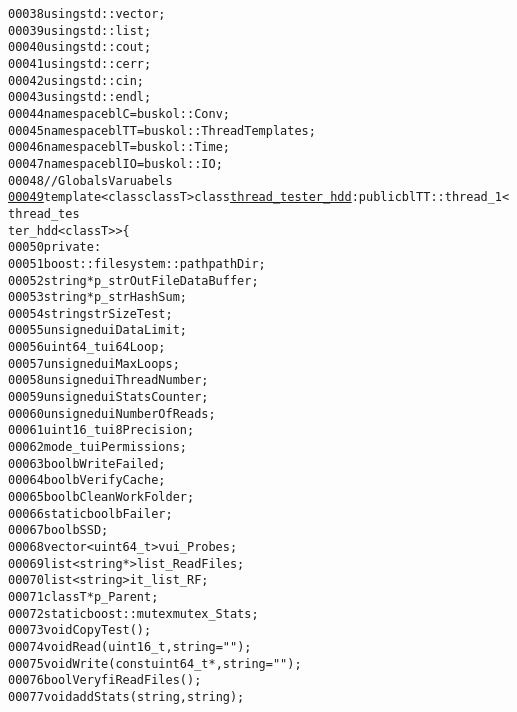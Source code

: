 \begin{footnotesize}
\begin{alltt}
00038 \textcolor{keyword}{using} std::vector;
00039 \textcolor{keyword}{using} std::list;
00040 \textcolor{keyword}{using} std::cout;
00041 \textcolor{keyword}{using} std::cerr;
00042 \textcolor{keyword}{using} std::cin;
00043 \textcolor{keyword}{using} std::endl;
00044 \textcolor{keyword}{namespace }blC = buskol::Conv;
00045 \textcolor{keyword}{namespace }blTT = buskol::ThreadTemplates;
00046 \textcolor{keyword}{namespace }blT = buskol::Time;
00047 \textcolor{keyword}{namespace }blIO = buskol::IO;
00048 \textcolor{comment}{//Globals Varuabels}
\hypertarget{thread__tester__hdd_8hpp_source_l00049}{}\hyperlink{classthread__tester__hdd}{00049} \textcolor{keyword}{template} <\textcolor{keyword}{class} \textcolor{keyword}{class}T> \textcolor{keyword}{class }\hyperlink{classthread__tester__hdd}{thread_tester_hdd}: \textcolor{keyword}{public} blTT::thread\_1<thread\_tes
      ter\_hdd<classT> >\{
00050     \textcolor{keyword}{private}:
00051         boost::filesystem::path pathDir; 
00052         \textcolor{keywordtype}{string} *p\_strOutFileDataBuffer; 
00053         \textcolor{keywordtype}{string} *p\_strHashSum; 
00054         \textcolor{keywordtype}{string} strSizeTest; 
00055         \textcolor{keywordtype}{unsigned} uiDataLimit; 
00056         uint64\_t ui64Loop;
00057         \textcolor{keywordtype}{unsigned} uiMaxLoops; 
00058         \textcolor{keywordtype}{unsigned} uiThreadNumber; 
00059         \textcolor{keywordtype}{unsigned} uiStatsCounter; 
00060         \textcolor{keywordtype}{unsigned} uiNumberOfReads;
00061         uint16\_t ui8Precision;
00062         mode\_t uiPermissions; 
00063         \textcolor{keywordtype}{bool} bWriteFailed;
00064         \textcolor{keywordtype}{bool} bVerifyCache;
00065         \textcolor{keywordtype}{bool} bCleanWorkFolder;
00066         \textcolor{keyword}{static} \textcolor{keywordtype}{bool} bFailer; 
00067         \textcolor{keywordtype}{bool} bSSD;
00068         vector<uint64\_t> vui\_Probes; 
00069         list<string*> list\_ReadFiles; 
00070         list<string> it\_list\_RF; 
00071         classT *p\_Parent;
00072         \textcolor{keyword}{static} boost::mutex mutex\_Stats; 
00073         \textcolor{keywordtype}{void} CopyTest();
00074         \textcolor{keywordtype}{void} Read(uint16\_t,\textcolor{keywordtype}{string} =\textcolor{stringliteral}{""});
00075         \textcolor{keywordtype}{void} Write(\textcolor{keyword}{const} uint64\_t *,\textcolor{keywordtype}{string} =\textcolor{stringliteral}{""});
00076         \textcolor{keywordtype}{bool} VeryfiReadFiles();
00077         \textcolor{keywordtype}{void} addStats(\textcolor{keywordtype}{string},\textcolor{keywordtype}{string});

\end{alltt}
\end{footnotesize}
